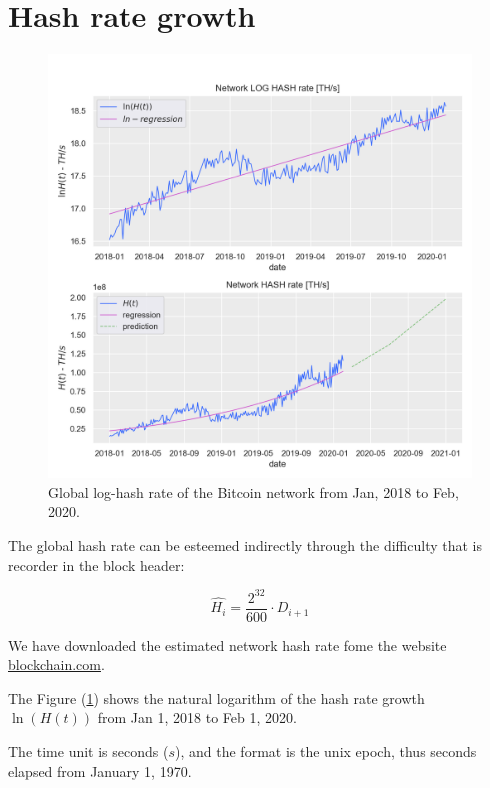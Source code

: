 \documentclass{book}
\theoremstyle{definition}
\begin{document}
\newpage

\section{Hash rate growth}

\begin{figure}[!htb]
    \centering
    \includegraphics[width=1.0\textwidth]{img/bitcoin-hash-rate.png}
    \caption{Global log-hash rate of the Bitcoin network from Jan, 2018 to Feb, 2020.}
    \label{fig:hash_power}
\end{figure}

The global hash rate can be esteemed indirectly through the difficulty that is recorder in the block header:

\begin{equation}
    \widehat{H_{i}} = \frac{2^{32}}{600} \cdot D_{i+1} \label{H_estimate}
\end{equation}

We have downloaded the estimated network hash rate fome the website \href{https://www.blockchain.com/}{blockchain.com}.

The Figure (\ref{fig:hash_power}) shows the natural logarithm of the hash rate growth $\ln(H(t))$ from Jan 1, 2018 to Feb 1, 2020.

The time unit is seconds ($s$), and the format is the unix epoch, thus seconds elapsed from January 1, 1970.
\end{document}
